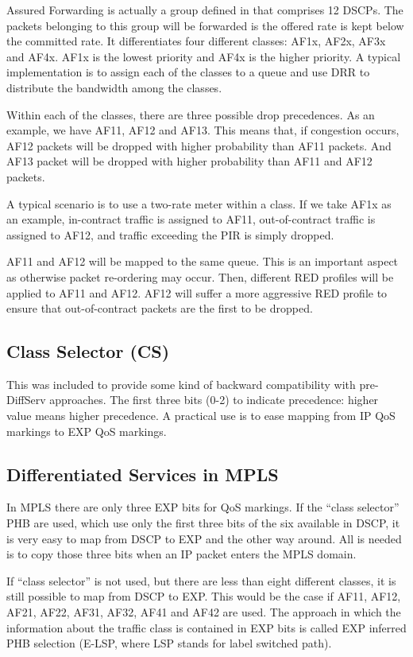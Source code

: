 Assured Forwarding is actually a group defined in \cite{rfc3260} that comprises 12 DSCPs.
The packets belonging to this group will be forwarded is the offered rate is kept below the committed rate.
It differentiates four different classes: AF1x, AF2x, AF3x and AF4x.
AF1x is the lowest priority and AF4x is the higher priority.
A typical implementation is to assign each of the classes to a queue and use DRR to distribute the bandwidth among the classes.

Within each of the classes, there are three possible drop precedences.
As an example, we have AF11, AF12 and AF13.
This means that, if congestion occurs, AF12 packets will be dropped with higher probability than AF11 packets.
And AF13 packet will be dropped with higher probability than AF11 and AF12 packets.

A typical scenario is to use a two-rate meter within a class.
If we take AF1x as an example, in-contract traffic is assigned to AF11, out-of-contract traffic is assigned to AF12, and traffic exceeding the PIR is simply dropped.

AF11 and AF12 will be mapped to the same queue.
This is an important aspect as otherwise packet re-ordering may occur.
Then, different RED profiles will be applied to AF11 and AF12.
AF12 will suffer a more aggressive RED profile to ensure that out-of-contract packets are the first to be dropped.

\subsection{Class Selector (CS)}
This was included to provide some kind of backward compatibility with pre-DiffServ approaches.
The first three bits (0-2) to indicate precedence: higher value means higher precedence.
A practical use is to ease mapping from IP QoS markings to EXP QoS markings.


\subsection{Differentiated Services in MPLS}
In MPLS there are only three EXP bits for QoS markings.
If the ``class selector'' PHB are used, which use only the first three bits of the six available in DSCP, it is very easy to map from DSCP to EXP and the other way around.
All is needed is to copy those three bits when an IP packet enters the MPLS domain.

If ``class selector'' is not used, but there are less than eight different classes, it is still possible to map from DSCP to EXP.
This would be the case if AF11, AF12, AF21, AF22, AF31, AF32, AF41 and AF42 are used.
The approach in which the information about the traffic class is contained in EXP bits is called EXP inferred PHB selection (E-LSP, where LSP stands for label switched path).


